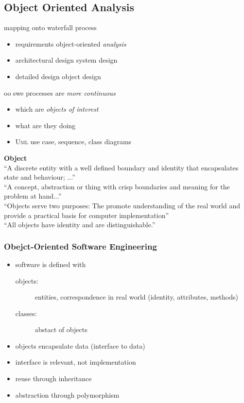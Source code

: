 \documentclass[a4paper, 10pt]{article}
\begin{document}
\subsection*{Object Oriented Analysis}
mapping onto waterfall process
\begin{itemize}
	\item requirements \follows object-oriented \emph{analysis}
	\item architectural design \follows system design
	\item detailed design \follows object design
\end{itemize}
oo swe processes are \emph{more continuous}
\begin{itemize}
	\item which are \emph{objects of interest}
	\item what are they doing
	\item \textsc{Uml} use case, sequence, class diagrams
\end{itemize}

\begin{shaded}
\textbf{Object} \\
``A discrete entity with a well defined boundary and identity that encapsulates state and behaviour; ...'' \\
``A concept, abstraction or thing with crisp boundaries and meaning for the problem at hand...''\\
``Objects serve two purposes: The promote understanding of the real world and provide a practical basis for computer implementation'' \\
``All objects have identity and are distinguishable.''
\end{shaded}

\subsubsection{Obejct-Oriented Software Engineering}
\begin{itemize}
	\item software is defined with
	\begin{description}
		\item[objects:] entities, correspondence in real world (identity, attributes, methods)
		\item[classes:] abstact of objects
	\end{description}
	\item objects encapsulate data (interface to data)
	\item interface is relevant, not implementation
	\item reuse through inheritance
	\item abstraction through polymorphism
\end{itemize}
\end{document}
